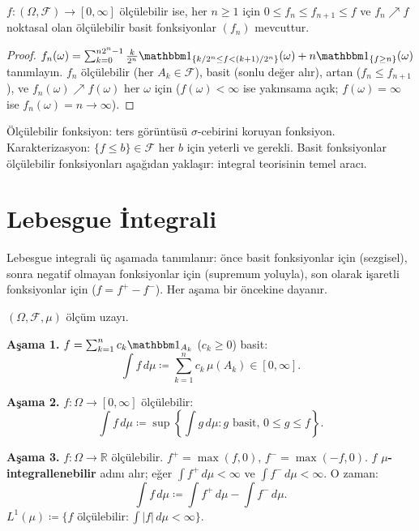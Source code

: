 \begin{teorem}\label{thm:basityaklasim}
$f: (\Omega, \mathcal{F}) \to [0,\infty]$ ölçülebilir ise, her $n \geq 1$ için
$0 \leq f_n \leq f_{n+1} \leq f$ ve $f_n \nearrow f$ noktasal olan ölçülebilir
basit fonksiyonlar $(f_n)$ mevcuttur.
\end{teorem}

\begin{proof}
$f_n(\omega) = \sum_{k=0}^{n 2^n - 1} \frac{k}{2^n} \gostf{\{k/2^n \leq f < (k+1)/2^n\}}(\omega) + n \gostf{\{f \geq n\}}(\omega)$
tanımlayın. $f_n$ ölçülebilir (her $A_k \in \mathcal{F}$), basit (sonlu değer alır),
artan ($f_n \leq f_{n+1}$), ve $f_n(\omega) \nearrow f(\omega)$ her $\omega$ için
($f(\omega) < \infty$ ise yakınsama açık; $f(\omega) = \infty$ ise $f_n(\omega) = n \to \infty$).
\end{proof}

\begin{mikroozet}[§1.5 özeti]
Ölçülebilir fonksiyon: ters görüntüsü $\sigma$-cebirini koruyan fonksiyon.
Karakterizasyon: $\{f \leq b\} \in \mathcal{F}$ her $b$ için yeterli ve gerekli.
Basit fonksiyonlar ölçülebilir fonksiyonları aşağıdan yaklaşır: integral
teorisinin temel aracı.
\end{mikroozet}


\section{Lebesgue İntegrali}

\begin{motivasyon}[§1.6]
Lebesgue integrali üç aşamada tanımlanır: önce basit fonksiyonlar için
(sezgisel), sonra negatif olmayan fonksiyonlar için (supremum yoluyla),
son olarak işaretli fonksiyonlar için ($f = f^+ - f^-$). Her aşama
bir öncekine dayanır.
\end{motivasyon}

\begin{tanim}\label{def:lebesgueintegral}
$(\Omega, \mathcal{F}, \mu)$ ölçüm uzayı.

\medskip

\textbf{Aşama 1.} $f = \sum_{k=1}^n c_k \gostf{A_k}$ ($c_k \geq 0$) basit:
\[
  \int f \, d\mu \coloneqq \sum_{k=1}^n c_k \, \mu(A_k) \in [0,\infty].
\]

\textbf{Aşama 2.} $f: \Omega \to [0,\infty]$ ölçülebilir:
\[
  \int f \, d\mu \coloneqq \sup\left\{ \int g \, d\mu :
    g \text{ basit, } 0 \leq g \leq f \right\}.
\]

\textbf{Aşama 3.} $f: \Omega \to \mathbb{R}$ ölçülebilir. $f^+ = \max(f,0)$,
$f^- = \max(-f,0)$. $f$ \textbf{$\mu$-integrallenebilir} adını alır; eğer
$\int f^+ \, d\mu < \infty$ ve $\int f^- \, d\mu < \infty$. O zaman:
\[
  \int f \, d\mu \coloneqq \int f^+ \, d\mu - \int f^- \, d\mu.
\]
$L^1(\mu) \coloneqq \{f \text{ ölçülebilir} : \int |f| \, d\mu < \infty\}$.
\end{tanim}


